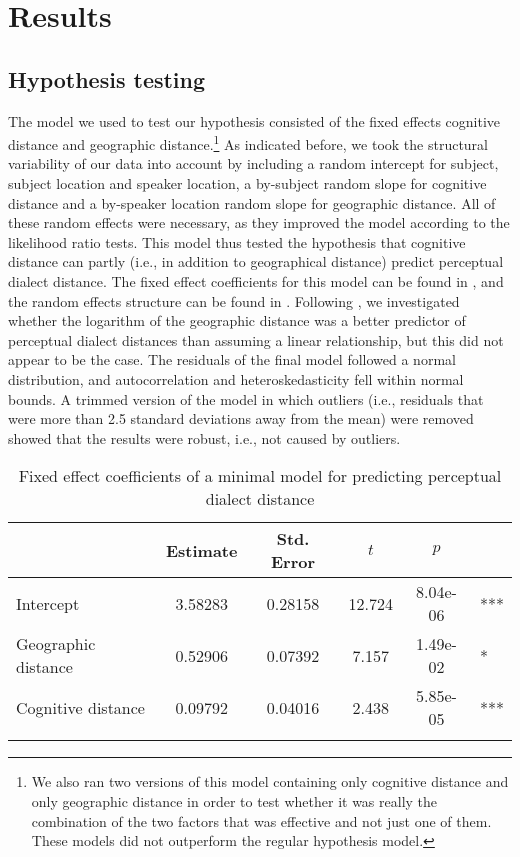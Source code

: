 \documentclass[output=paper,colorlinks,citecolor=brown,draft]{langscibook}
\begin{document}
\section{Results}
\subsection{Hypothesis testing}
The model we used to test our hypothesis consisted of the fixed effects cognitive distance and geographic distance.\footnote{We also ran two versions of this model containing only cognitive distance and only geographic distance in order to test whether it was really the combination of the two factors that was effective and not just one of them. These models did not outperform the regular hypothesis model.} As indicated before, we took the structural variability of our data into account by including a random intercept for subject, subject location and speaker location, a by-subject random slope for cognitive distance and a by-speaker location random slope for geographic distance. All of these random effects were necessary, as they improved the model according to the likelihood ratio tests. This model thus tested the hypothesis that cognitive distance can partly (i.e., in addition to geographical distance) predict perceptual dialect distance. The fixed effect coefficients for this model can be found in , and the random effects structure can be found in . Following \citet{nerbonne_measuring_2010}, we investigated whether the logarithm of the geographic distance was a better predictor of perceptual dialect distances than assuming a linear relationship, but this did not appear to be the case. The residuals of the final model followed a normal distribution, and autocorrelation and heteroskedasticity fell within normal bounds. A trimmed version of the model in which outliers (i.e., residuals that were more than 2.5 standard deviations away from the mean) were removed showed that the results were robust, i.e., not caused by outliers.  

\begin{table}
 \begin{tabular}{lcc S[table-format=2.3] S[table-format=1.2e-2] @{~}l }
  \lsptoprule
                 & {Estimate} & {Std. Error}  & {$t$} & {$p$} & \\
  \midrule
    Intercept           & 3.58283 & 0.28158 & 12.724 & 8.04e-06 & ***\\
    Geographic distance & 0.52906 & 0.07392 & 7.157 & 1.49e-02 & * \\
    Cognitive distance  & 0.09792 & 0.04016 & 2.438 & 5.85e-05 & ***\\
  \lspbottomrule
 \end{tabular}
\caption{Fixed effect coefficients of a minimal model for predicting perceptual dialect distance}
\label{tab:fec_min}
\end{table}
\end{document}
